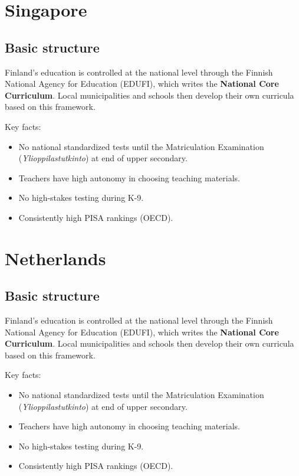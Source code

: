 

\chapter{Singapore}


\section{Basic structure}

Finland's education is controlled at the national level through the Finnish National Agency for Education (EDUFI), which writes the \textbf{National Core Curriculum}. Local municipalities and schools then develop their own curricula based on this framework.

Key facts:
\begin{itemize}
	\item No national standardized tests until the Matriculation Examination (\textit{Ylioppilastutkinto}) at end of upper secondary.
	\item Teachers have high autonomy in choosing teaching materials.
	\item No high-stakes testing during K-9.
	\item Consistently high PISA rankings (OECD).
\end{itemize}





\chapter{Netherlands}


\section{Basic structure}

Finland's education is controlled at the national level through the Finnish National Agency for Education (EDUFI), which writes the \textbf{National Core Curriculum}. Local municipalities and schools then develop their own curricula based on this framework.

Key facts:
\begin{itemize}
	\item No national standardized tests until the Matriculation Examination (\textit{Ylioppilastutkinto}) at end of upper secondary.
	\item Teachers have high autonomy in choosing teaching materials.
	\item No high-stakes testing during K-9.
	\item Consistently high PISA rankings (OECD).
\end{itemize}



